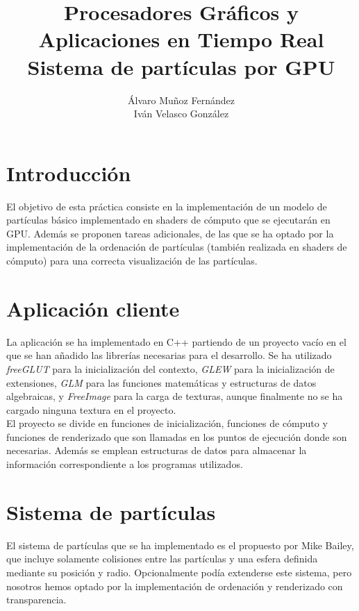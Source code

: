 \documentclass[10pt,oneside,a4paper]{article}
\begin{document}
\begin{titlepage}

\title{\Huge Procesadores Gráficos y Aplicaciones en Tiempo Real  \\[0.7in] \LARGE Sistema de partículas por GPU\\[3.6in]}
\date{}
\author{Álvaro Muñoz Fernández\\
Iván Velasco González}
\maketitle
\thispagestyle{empty}
\end{titlepage}

\section{Introducción}
El objetivo de esta práctica consiste en la implementación de un modelo de partículas básico implementado en shaders de cómputo que se ejecutarán en GPU. Además se proponen tareas adicionales, de las que se ha optado por la implementación de la ordenación de partículas (también realizada en shaders de cómputo) para una correcta visualización de las partículas.

\section{Aplicación cliente}
La aplicación se ha implementado en C++ partiendo de un proyecto vacío en el que se han añadido las librerías necesarias para el desarrollo. Se ha utilizado \textit{freeGLUT} para la inicialización del contexto, \textit{GLEW} para la inicialización de extensiones, \textit{GLM} para las funciones matemáticas y estructuras de datos algebraicas, y \textit{FreeImage} para la carga de texturas, aunque finalmente no se ha cargado ninguna textura en el proyecto.\\

El proyecto se divide en funciones de inicialización, funciones de cómputo y funciones de renderizado que son llamadas en los puntos de ejecución donde son necesarias. Además se emplean estructuras de datos para almacenar la información correspondiente a los programas utilizados.

\section{Sistema de partículas}
El sistema de partículas que se ha implementado es el propuesto por Mike Bailey, que incluye solamente colisiones entre las partículas y una esfera definida mediante su posición y radio. Opcionalmente podía extenderse este sistema, pero nosotros hemos optado por la implementación de ordenación y renderizado con transparencia.\\
\end{document}
